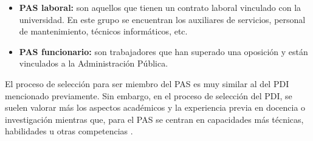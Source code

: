 \begin{itemize}
    \item \textbf{PAS laboral:} son aquellos que tienen un contrato laboral vinculado con la universidad. En este grupo se encuentran los auxiliares de servicios, personal de mantenimiento, técnicos informáticos, etc.
    \item \textbf{PAS funcionario:} son trabajadores que han superado una oposición y están vinculados a la Administración Pública.
\end{itemize}

El proceso de selección para ser miembro del PAS es muy similar al del PDI mencionado previamente. Sin embargo, en el proceso de selección del PDI, se suelen valorar más los aspectos académicos y la experiencia previa en docencia o investigación mientras que, para el PAS se centran en capacidades más técnicas, habilidades u otras competencias \cite{pas:latex}.